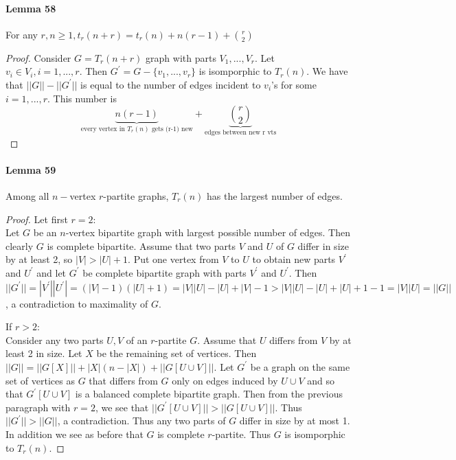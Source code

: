 \paragraph{Lemma 58} For any $ r,n \geq 1, t_r(n+r) = t_r(n) + n(r-1) + \binom{r}{2}$
\begin{proof}
    Consider $ G = T_r(n+r) $ graph with parts $ V_1,...,V_r$. Let $ v_i \in V_i,
    i = 1,...,r$. Then $ G^\prime = G - \{v_1,...,v_r\} $ is isomporphic to $T_r(n)$.
    We have that $ ||G|| - ||G^\prime|| $ is equal to the number of edges incident to 
    $ v_i$'s for some $ i = 1,...,r$. This number is 
    $$ \underbrace{n(r-1)}_{\text{every vertex in } T_r(n) \text{ gets (r-1) new}} + 
    \underbrace{\binom{r}{2}}_\text{edges between new r vts} $$
\end{proof}

\paragraph{Lemma 59} Among all $n-$vertex $r$-partite graphs, $ T_r(n) $ has the largest 
number of edges.
\begin{proof}
    Let first $ r = 2 $: \\
    Let $ G $ be an $n$-vertex bipartite graph with largest possible
    number of edges. Then clearly $ G $ is complete bipartite. Assume that two parts $ V $
    and $ U $ of $ G $ differ in size by at least 2, so $ |V| > |U| + 1$. Put one 
    vertex from $ V $ to $ U $ to obtain new parts $ V^\prime $ and $ U^\prime $ 
    and let $ G^\prime $ be complete bipartite graph with parts $ V^\prime $ and 
    $ U^\prime $. Then $ ||G^\prime|| = |V^\prime||U^\prime| = (|V|-1)(|U|+1) 
    = |V||U| - |U| + |V| -1 > |V||U| - |U| + |U| + 1 - 1 = |V||U| = ||G||$, a 
    contradiction to maximality of $G$.

    \bigskip \noindent
    If $ r > 2 $: \\
    Consider any two parts $ U, V $ of an $r$-partite $G$. Assume that $ U $ differs
    from $ V $ by at least 2 in size. Let $ X $ be the remaining set of vertices. 
    Then $ ||G|| = ||G[X]|| + |X|(n-|X|) + ||G[U\cup V]|| $.  Let $ G^\prime $ be a 
    graph on the same set of vertices as $ G $ that differs from $ G $ only on edges 
    induced by $ U \cup V $ and so that $ G^\prime[U \cup V] $ is a balanced complete 
    bipartite graph. Then from the previous paragraph with $ r = 2 $, we see that 
    $ ||G^\prime[U \cup V]|| > ||G[U \cup V]||$. Thus $ ||G^\prime|| > ||G||$, a
    contradiction. Thus any two parts of $ G $ differ in size by at most 1. In 
    addition we see as before that $ G $ is complete $r$-partite. Thus $ G $ is 
    isomporphic to $T_r(n)$.      
\end{proof}

